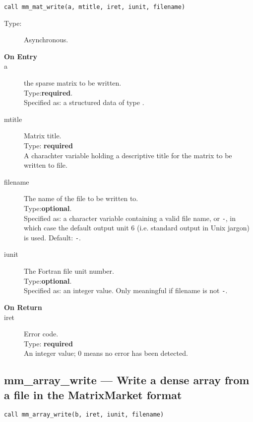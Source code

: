 \begin{lstlisting}
call mm_mat_write(a, mtitle, iret, iunit, filename)
\end{lstlisting}
\begin{description}
\item[Type:] Asynchronous.
\item[\bf  On Entry ]
\item[a] the sparse matrix to be written.\\
Type:{\bf required}.\\
Specified as: a structured data of type \spdata.
\item[mtitle] Matrix title.\\
Type: {\bf required} \\
A charachter variable holding a descriptive title for the matrix to be
 written to file.
\item[filename] The name of the file to be written to.\\
Type:{\bf optional}.\\
Specified as: a character variable containing a valid file name, or
\verb|-|, in which case the default output unit  6 (i.e. standard output
in Unix jargon) is used. Default: \verb|-|. 
\item[iunit] The Fortran file unit number.\\
Type:{\bf optional}.\\
Specified as: an integer value. Only meaningful if filename is not \verb|-|.
\end{description}

\begin{description}
\item[\bf On Return]
\item[iret] Error code.\\
Type: {\bf required} \\
An integer value; 0 means no error has been detected. 
\end{description}


\clearpage\subsection*{mm\_array\_write ---  Write a dense array from a
  file in the MatrixMarket format}

\begin{lstlisting}
call mm_array_write(b, iret, iunit, filename)
\end{lstlisting}

